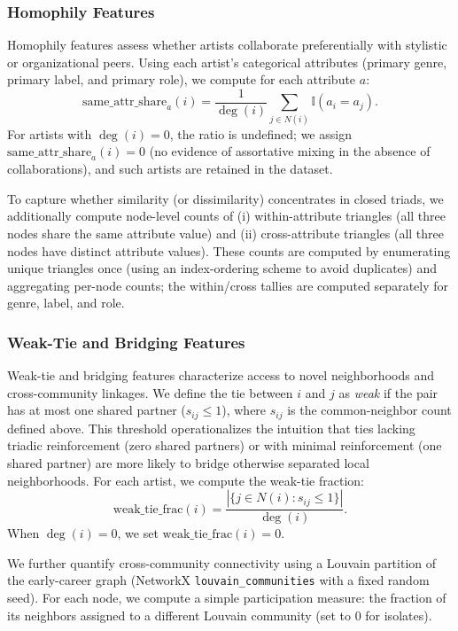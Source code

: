 \documentclass[fleqn,10pt]{wlscirep}
\begin{document}
\subsubsection*{Homophily Features}
Homophily features assess whether artists collaborate preferentially with stylistic or organizational peers. Using each artist’s categorical attributes (primary genre, primary label, and primary role), we compute for each attribute $a$:
\begin{equation}
\text{same\_attr\_share}_a(i)
= \frac{1}{\deg(i)} \sum_{j \in N(i)} \mathbb{I}(a_i = a_j).
\end{equation}
For artists with $\deg(i)=0$, the ratio is undefined; we assign $\text{same\_attr\_share}_a(i)=0$ (no evidence of assortative mixing in the absence of collaborations), and such artists are retained in the dataset.

To capture whether similarity (or dissimilarity) concentrates in closed triads, we additionally compute node-level counts of (i) within-attribute triangles (all three nodes share the same attribute value) and (ii) cross-attribute triangles (all three nodes have distinct attribute values). These counts are computed by enumerating unique triangles once (using an index-ordering scheme to avoid duplicates) and aggregating per-node counts; the within/cross tallies are computed separately for genre, label, and role.

\subsubsection*{Weak-Tie and Bridging Features}
Weak-tie and bridging features characterize access to novel neighborhoods and cross-community linkages. We define the tie between $i$ and $j$ as \emph{weak} if the pair has at most one shared partner ($s_{ij}\le 1$), where $s_{ij}$ is the common-neighbor count defined above. This threshold operationalizes the intuition that ties lacking triadic reinforcement (zero shared partners) or with minimal reinforcement (one shared partner) are more likely to bridge otherwise separated local neighborhoods. For each artist, we compute the weak-tie fraction:
\begin{equation}
\text{weak\_tie\_frac}(i)
= \frac{|\{j \in N(i): s_{ij} \le 1\}|}{\deg(i)}.
\end{equation}
When $\deg(i)=0$, we set $\text{weak\_tie\_frac}(i)=0$.

We further quantify cross-community connectivity using a Louvain partition of the early-career graph (NetworkX \texttt{louvain\_communities} with a fixed random seed). For each node, we compute a simple participation measure: the fraction of its neighbors assigned to a different Louvain community (set to 0 for isolates).
\end{document}

